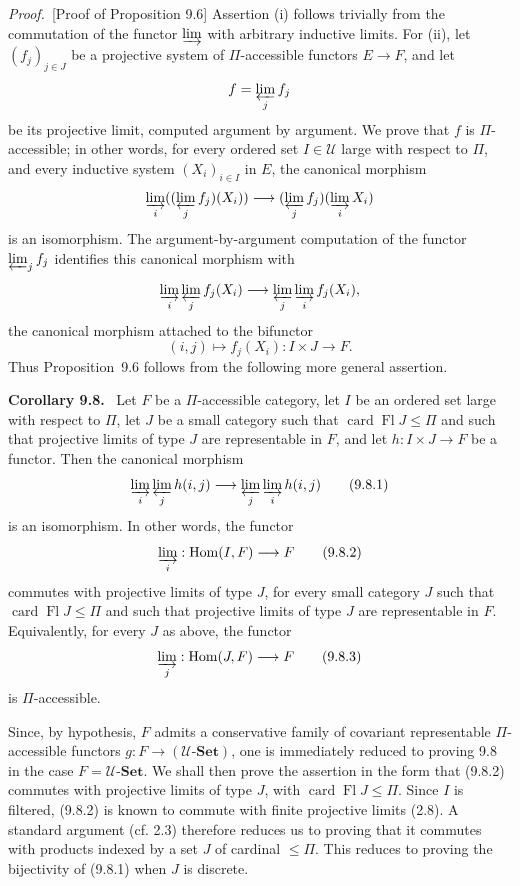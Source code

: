 \documentclass[11pt]{article}
\newcommand{\U}{\mathcal{U}}
\newcommand{\Set}{\mathbf{Set}}
\newcommand{\card}{\operatorname{card}}
\newcommand{\Fl}{\operatorname{Fl}}
\newcommand{\Hhom}{\operatorname{Hom}}
\newenvironment{statement}[1]{\par\medskip\noindent\textbf{#1.}\ }{\par\medskip}
\newenvironment{prooftext}{\par\noindent\emph{Proof.}\ }{\par\medskip}
\begin{document}
\begin{prooftext}[Proof of Proposition 9.6]
Assertion (i) follows trivially from the commutation of the functor $\varinjlim$ with arbitrary inductive limits. For (ii), let $(f_j)_{j\in J}$ be a projective system of $\Pi$-accessible functors $E\to F$, and let
\[
 f=\varprojlim_j f_j
\]
be its projective limit, computed argument by argument. We prove that $f$ is $\Pi$-accessible; in other words, for every ordered set $I\in\U$ large with respect to $\Pi$, and every inductive system $(X_i)_{i\in I}$ in $E$, the canonical morphism
\[
 \varinjlim_i ((\varprojlim_j f_j)(X_i))\longrightarrow
 (\varprojlim_j f_j)(\varinjlim_i X_i)
\]
is an isomorphism. The argument-by-argument computation of the functor $\varprojlim_j f_j$ identifies this canonical morphism with
\[
 \varinjlim_i \varprojlim_j f_j(X_i)
 \longrightarrow
 \varprojlim_j \varinjlim_i f_j(X_i),
\]
the canonical morphism attached to the bifunctor
\[
 (i,j)\longmapsto f_j(X_i):I\times J\longrightarrow F.
\]
Thus Proposition~9.6 follows from the following more general assertion.
\end{prooftext}

\begin{statement}{Corollary 9.8}
Let $F$ be a $\Pi$-accessible category, let $I$ be an ordered set large with respect to $\Pi$, let $J$ be a small category such that $\card\Fl J\leq \Pi$ and such that projective limits of type $J$ are representable in $F$, and let $h:I\times J\to F$ be a functor. Then the canonical morphism
\begin{equation}
 \varinjlim_i \varprojlim_j h(i,j)
 \longrightarrow
 \varprojlim_j \varinjlim_i h(i,j)
\tag{9.8.1}
\end{equation}
is an isomorphism. In other words, the functor
\begin{equation}
 \varinjlim_i:\Hhom(I,F)\longrightarrow F
\tag{9.8.2}
\end{equation}
commutes with projective limits of type $J$, for every small category $J$ such that $\card\Fl J\leq \Pi$ and such that projective limits of type $J$ are representable in $F$. Equivalently, for every $J$ as above, the functor
\begin{equation}
 \varinjlim_j:\Hhom(J,F)\longrightarrow F
\tag{9.8.3}
\end{equation}
is $\Pi$-accessible.
\end{statement}

Since, by hypothesis, $F$ admits a conservative family of covariant representable $\Pi$-accessible functors $g:F\to(\U\text{-}\Set)$, one is immediately reduced to proving 9.8 in the case $F=\U\text{-}\Set$. We shall then prove the assertion in the form that (9.8.2) commutes with projective limits of type $J$, with $\card\Fl J\leq \Pi$. Since $I$ is filtered, (9.8.2) is known to commute with finite projective limits (2.8). A standard argument (cf. 2.3) therefore reduces us to proving that it commutes with products indexed by a set $J$ of cardinal $\leq\Pi$. This reduces to proving the bijectivity of (9.8.1) when $J$ is discrete.
\end{document}
